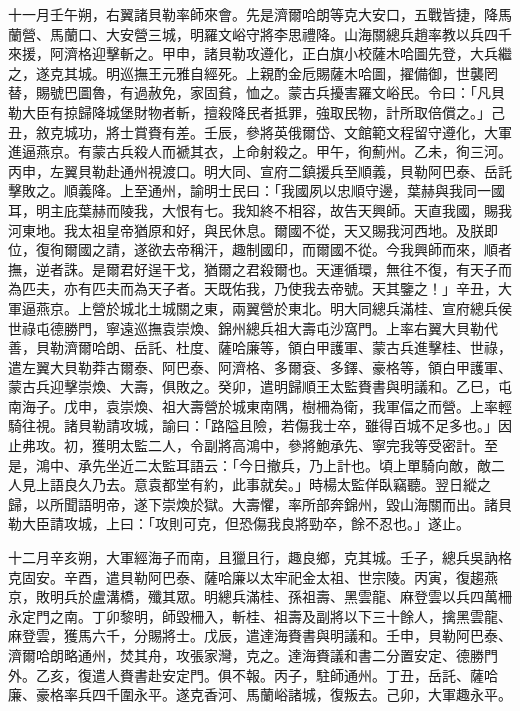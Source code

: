 \begin{pinyinscope}
十一月壬午朔，右翼諸貝勒率師來會。先是濟爾哈朗等克大安口，五戰皆捷，降馬蘭營、馬蘭口、大安營三城，明羅文峪守將李思禮降。山海關總兵趙率教以兵四千來援，阿濟格迎擊斬之。甲申，諸貝勒攻遵化，正白旗小校薩木哈圖先登，大兵繼之，遂克其城。明巡撫王元雅自經死。上親酌金卮賜薩木哈圖，擢備御，世襲罔替，賜號巴圖魯，有過赦免，家固貧，恤之。蒙古兵擾害羅文峪民。令曰：「凡貝勒大臣有掠歸降城堡財物者斬，擅殺降民者抵罪，強取民物，計所取倍償之。」己丑，敘克城功，將士賞賚有差。壬辰，參將英俄爾岱、文館範文程留守遵化，大軍進逼燕京。有蒙古兵殺人而褫其衣，上命射殺之。甲午，徇薊州。乙未，徇三河。丙申，左翼貝勒赴通州視渡口。明大同、宣府二鎮援兵至順義，貝勒阿巴泰、岳託擊敗之。順義降。上至通州，諭明士民曰：「我國夙以忠順守邊，葉赫與我同一國耳，明主庇葉赫而陵我，大恨有七。我知終不相容，故告天興師。天直我國，賜我河東地。我太祖皇帝猶原和好，與民休息。爾國不從，天又賜我河西地。及朕即位，復徇爾國之請，遂欲去帝稱汗，趣制國印，而爾國不從。今我興師而來，順者撫，逆者誅。是爾君好逞干戈，猶爾之君殺爾也。天運循環，無往不復，有天子而為匹夫，亦有匹夫而為天子者。天既佑我，乃使我去帝號。天其鑒之！」辛丑，大軍逼燕京。上營於城北土城關之東，兩翼營於東北。明大同總兵滿桂、宣府總兵侯世祿屯德勝門，寧遠巡撫袁崇煥、錦州總兵祖大壽屯沙窩門。上率右翼大貝勒代善，貝勒濟爾哈朗、岳託、杜度、薩哈廉等，領白甲護軍、蒙古兵進擊桂、世祿，遣左翼大貝勒莽古爾泰、阿巴泰、阿濟格、多爾袞、多鐸、豪格等，領白甲護軍、蒙古兵迎擊崇煥、大壽，俱敗之。癸卯，遣明歸順王太監賚書與明議和。乙巳，屯南海子。戊申，袁崇煥、祖大壽營於城東南隅，樹柵為衛，我軍偪之而營。上率輕騎往視。諸貝勒請攻城，諭曰：「路隘且險，若傷我士卒，雖得百城不足多也。」因止弗攻。初，獲明太監二人，令副將高鴻中，參將鮑承先、寧完我等受密計。至是，鴻中、承先坐近二太監耳語云：「今日撤兵，乃上計也。頃上單騎向敵，敵二人見上語良久乃去。意袁都堂有約，此事就矣。」時楊太監佯臥竊聽。翌日縱之歸，以所聞語明帝，遂下崇煥於獄。大壽懼，率所部奔錦州，毀山海關而出。諸貝勒大臣請攻城，上曰：「攻則可克，但恐傷我良將勁卒，餘不忍也。」遂止。

十二月辛亥朔，大軍經海子而南，且獵且行，趣良鄉，克其城。壬子，總兵吳訥格克固安。辛酉，遣貝勒阿巴泰、薩哈廉以太牢祀金太祖、世宗陵。丙寅，復趨燕京，敗明兵於盧溝橋，殲其眾。明總兵滿桂、孫祖壽、黑雲龍、麻登雲以兵四萬柵永定門之南。丁卯黎明，師毀柵入，斬桂、祖壽及副將以下三十餘人，擒黑雲龍、麻登雲，獲馬六千，分賜將士。戊辰，遣達海賚書與明議和。壬申，貝勒阿巴泰、濟爾哈朗略通州，焚其舟，攻張家灣，克之。達海賚議和書二分置安定、德勝門外。乙亥，復遣人賚書赴安定門。俱不報。丙子，駐師通州。丁丑，岳託、薩哈廉、豪格率兵四千圍永平。遂克香河、馬蘭峪諸城，復叛去。己卯，大軍趣永平。


\end{pinyinscope}
